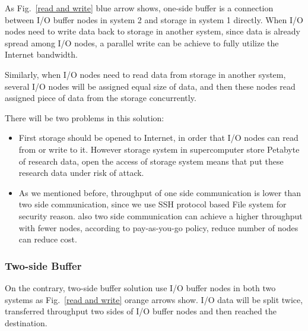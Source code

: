 As Fig.~\ref{read and write} blue arrow shows, one-side buffer is a connection between I/O buffer nodes in system 2 and storage in system 1 directly.
When I/O nodes need to write data back to storage in another system, since data is already spread among I/O nodes, a parallel write can be achieve to fully utilize the Internet bandwidth.

Similarly, when I/O nodes need to read data from storage in another system, several I/O nodes will be assigned equal size of data, and then these nodes read assigned piece of data from the storage concurrently.

There will be two problems in this solution:
\begin{itemize}
	\item First storage should be opened to Internet, in order that I/O nodes can read from or write to it.
		However storage system in supercomputer store Petabyte of research data, open the access of storage system means that put these research data under risk of attack.
	\item As we mentioned before, throughput of one side communication is lower than two side communication, since we use SSH protocol based File system for security reason.
		also two side communication can achieve a higher throughput with fewer nodes, according to pay-as-you-go policy, reduce number of nodes can reduce cost.
\end{itemize}


\subsubsection{Two-side Buffer}

On the contrary, two-side buffer solution use I/O buffer nodes in both two systems as Fig.~\ref{read and write} orange arrows show.
I/O data will be split twice, transferred throughput two sides of I/O buffer nodes and then reached the destination.

